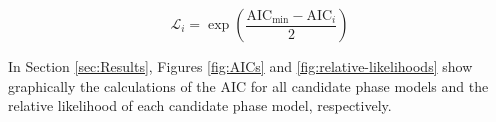 \begin{equation}
    \mathcal{L}_i = \exp{\left(
      \frac{\mathrm{AIC}_{\mathrm{min}} - \mathrm{AIC}_{i}}{2} 
      \right)
      }
  \label{eq:relative-likelihood}
\end{equation}


In Section \ref{sec:Results}, Figures \ref{fig:AICs} and \ref{fig:relative-likelihoods}
show graphically the calculations of the AIC for all candidate phase
models and the relative likelihood of each candidate phase model, respectively.

